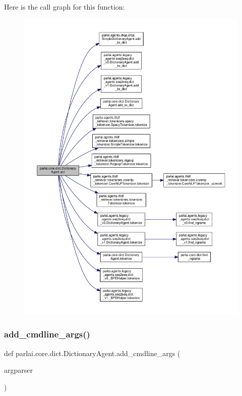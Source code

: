 Here is the call graph for this function\+:
\nopagebreak
\begin{figure}[H]
\begin{center}
\leavevmode
\includegraphics[width=350pt]{classparlai_1_1core_1_1dict_1_1DictionaryAgent_af34b92857b41748aafdecee34ebf9345_cgraph}
\end{center}
\end{figure}
\mbox{\label{classparlai_1_1core_1_1dict_1_1DictionaryAgent_ad09f8ecf2b258ecaebce69d9cef9ff3c}} 
\subsubsection{\texorpdfstring{add\+\_\+cmdline\+\_\+args()}{add\_cmdline\_args()}}
{\footnotesize\ttfamily def parlai.\+core.\+dict.\+Dictionary\+Agent.\+add\+\_\+cmdline\+\_\+args (\begin{DoxyParamCaption}\item[{}]{argparser }\end{DoxyParamCaption})\hspace{0.3cm}{\ttfamily [static]}}

